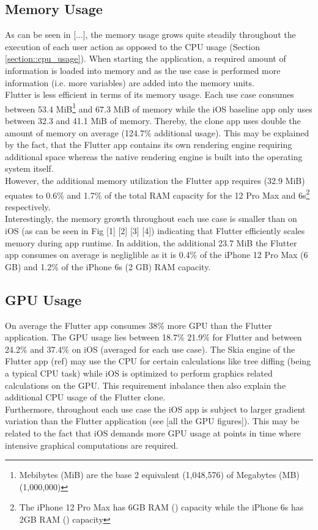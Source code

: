 \subsection{Memory Usage}
As can be seen in [...], the memory usage grows quite steadily throughout the execution of each user action as opposed to the CPU usage (Section \ref{section::cpu_usage}).
When starting the application, a required amount of information is loaded into memory and 
as the use case is performed more information (i.e. more variables) are added into the memory units.\\
Flutter is less efficient in terms of its memory usage. Each use case consumes between 53.4 MiB\footnote{Mebibytes (MiB) are the base 2 equivalent (1,048,576) of Megabytes (MB) (1,000,000)} and 67.3 MiB of memory while the iOS baseline app only uses between 32.3 and 41.1 MiB of memory.
Thereby, the clone app uses double the amount of memory on average (124.7\% additional usage).
This may be explained by the fact, that the Flutter app contains its own rendering engine requiring additional space whereas the native rendering engine is built into the operating system itself.\\
However, the additional memory utilization the Flutter app requires (32.9 MiB) equates to 0.6\% and 1.7\% of the total RAM capacity for the 12 Pro Max and 6s\footnote{The iPhone 12 Pro Max has 6GB RAM (\cite{GSMArena12ProMax2020}) capacity while the iPhone 6s has 2GB RAM (\cite{GSMArena2015}) capacity} respectively.\\
Interestingly, the memory growth throughout each use case is smaller than on iOS (as can be seen in Fig [1] [2] [3] [4]) indicating that Flutter efficiently scales memory during app runtime.
In addition, the additional 23.7 MiB the Flutter app consumes on average is negliglible as it is 0.4\% of the iPhone 12 Pro Max (6 GB) and 1.2\% of the 
iPhone 6s (2 GB) RAM capacity.

\subsection{GPU Usage}
On average the Flutter app consumes 38\% more GPU than the Flutter application. The GPU usage lies between 18.7\% 21.9\% for Flutter and between 24.2\% and 37.4\% on iOS (averaged for each use case).
The Skia engine of the Flutter app (ref) may use the CPU for certain calculations like tree diffing (being a typical CPU task) while iOS is optimized to perform graphics related calculations on the GPU.
This requirement inbalance then also explain the additional CPU usage of the Flutter clone.\\
Furthermore, throughout each use case the iOS app is subject to larger gradient variation than the Flutter application (see [all the GPU figures]).
This may be related to the fact that iOS demands more GPU usage at points in time where intensive graphical computations are required.


